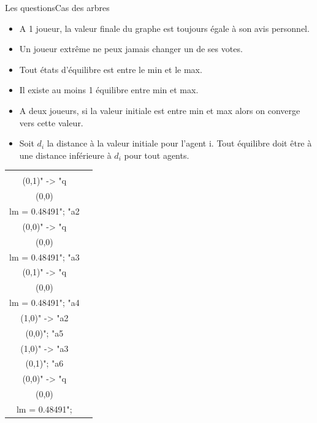 \documentclass{beamer}
\begin{document}
  \begin{frame}{Les questions}{Cas des arbres}
    \begin{itemize}
      \item<1-> A 1 joueur, la valeur finale du graphe est toujours égale à son avis personnel.
      \item<2-> Un joueur extrême ne peux jamais changer un de ses votes.
      \item<3-> Tout états d'équilibre est entre le min et le max.
      \item<4-> Il existe au moins 1 équilibre entre min et max.
      \item<5-> A deux joueurs, si la valeur initiale est entre min et max alors on converge vers cette valeur.
      \item<6-> Soit $d_i$ la distance à la valeur initiale pour l'agent i. Tout équilibre doit être à une distance inférieure à $d_i$ pour tout agents.
    \end{itemize}

    \begin{overprint}
      \begin{center}
        \begin{tabular}{cc}
          \begin{tikzpicture}[>=stealth]
            \graph [ layered layout, nodes = {scale=0.60, align=center} ] {
            "a1\\ (0,1)" -> "q\\ (0,0)\\lm = 0.48491";
            "a2\\ (0,0)" -> "q\\ (0,0)\\lm = 0.48491";
            "a3\\ (0,1)" -> "q\\ (0,0)\\lm = 0.48491";
            "a4\\ (1,0)" -> "a2\\ (0,0)";
            "a5\\ (1,0)" -> "a3\\ (0,1)";
            "a6\\ (0,0)" -> "q\\ (0,0)\\lm = 0.48491";
            };
          \end{tikzpicture}&


\end{tabular}
\end{center}
\end{overprint}
\end{frame}
\end{document}
